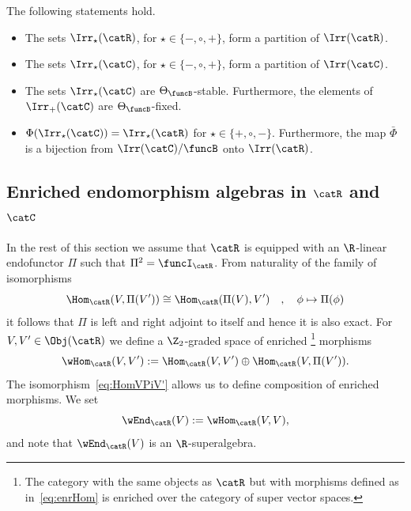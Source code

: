 \documentclass[12pt]{amsart}
\begin{document}
\begin{thm}
\label{thm:Irr=Irr}
The following statements hold.
\begin{itemize}
\item[\rm (i)]
The sets $\Irr_\star(\catR)$, for $\star\in\{-,\circ,+\}$, form a partition of $\Irr(\catR)$.
\item[\rm (ii)] The  
sets $\Irr_\star(\catC)$, for $\star\in\{-,\circ,+\}$, form a partition of $\Irr(\catC)$. 
\item[\rm (iii)] The sets 
$\Irr_\star(\catC)$ are $\Theta_\funcB$-stable. Furthermore, the elements of $\Irr_+(\catC)$ are $\Theta_\funcB$-fixed. 
\item[\rm (iv)]
$\Phi(\Irr_\star(\catC))=\Irr_\star(\catR)$ for $\star\in\{+,\circ,-\}$. Furthermore,  the  map $\bar\Phi$ is a  bijection from $\Irr(\catC)/\funcB$ onto $\Irr(\catR)$. 
\end{itemize}
\end{thm}



\subsection{Enriched endomorphism algebras in $\catR$ and $\catC$}

In the rest of this section we assume that $\catR$ is equipped with an $\R$-linear  endofunctor $\Pi$ such that $\Pi^2=\funcI_\catR$. 
From naturality of the family of isomorphisms 
\begin{equation}
\label{eq:HomVPiV'}
\Hom_\catR(V,\Pi (V'))\cong \Hom_\catR(\Pi (V),V')\quad,\quad \phi\mapsto\Pi(\phi)
\end{equation}
it follows that $\Pi$ is left and right adjoint to itself and hence it is also exact.  
For $V,V'\in\Obj(\catR)$ we define a $\Z_2$-graded space of 
enriched \footnote{The category with the same objects as $\catR$ but with morphisms defined as in~\eqref{eq:enrHom} is enriched over the category of super vector spaces. 
} morphisms
\begin{equation}
\label{eq:enrHom}
\wHom_\catR(V,V'):=\Hom_\catR(V,V')\oplus \Hom_\catR(V,\Pi(V')).
\end{equation}
The isomorphism~\eqref{eq:HomVPiV'} allows us to define composition of enriched morphisms.
%
%
%
%
%
%
%
%
%
We set \[
\wEnd_\catR(V):=\wHom_\catR(V,V),
\] and note that $\wEnd_\catR(V)$ is an $\R$-superalgebra. 
\end{document}
